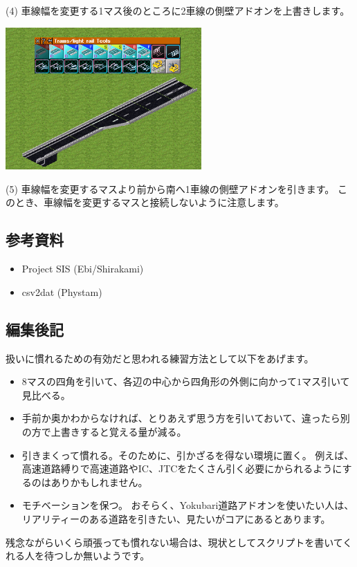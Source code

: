 \documentclass{jarticle}
\begin{document}
\begin{multicols}{2}
(4)
車線幅を変更する1マス後のところに2車線の側壁アドオンを上書きします。


\includegraphics[width = 75mm]{picture/20210214-road-5-5.png}

(5)
車線幅を変更するマスより前から南へ1車線の側壁アドオンを引きます。
このとき、車線幅を変更するマスと接続しないように注意します。


\end{multicols}

\newpage

\subsection{参考資料}
\begin{itemize}
  \item Project SIS (Ebi/Shirakami)
  \item csv2dat (Phystam)
\end{itemize}

\subsection{編集後記}

扱いに慣れるための有効だと思われる練習方法として以下をあげます。
\begin{itemize}
  \item
  $8$マスの四角を引いて、各辺の中心から四角形の外側に向かって$1$マス引いて見比べる。
  \item
  手前か奥かわからなければ、とりあえず思う方を引いておいて、違ったら別の方で上書きすると覚える量が減る。
  \item
  引きまくって慣れる。そのために、引かざるを得ない環境に置く。
  例えば、高速道路縛りで高速道路やIC、JTCをたくさん引く必要にかられるようにするのはありかもしれません。
  \item
  モチベーションを保つ。
  おそらく、Yokubari道路アドオンを使いたい人は、リアリティーのある道路を引きたい、見たいがコアにあるとあります。
\end{itemize}
残念ながらいくら頑張っても慣れない場合は、現状としてスクリプトを書いてくれる人を待つしか無いようです。
\end{document}
